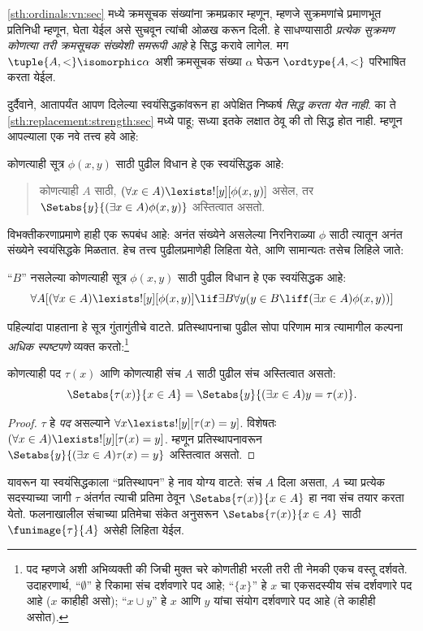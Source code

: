 \ref{sth:ordinals:vn:sec} मध्ये क्रमसूचक संख्यांना क्रमप्रकार म्हणून, म्हणजे सुक्रमणांचे प्रमाणभूत प्रतिनिधी म्हणून, घेता येईल असे सुचवून त्यांची ओळख करून दिली. हे साधण्यासाठी \emph{प्रत्येक सुक्रमण कोणत्या तरी क्रमसूचक संख्येशी समरूपी आहे} हे सिद्ध करावे लागेल. मग $\tuple{A, <} \isomorphic \alpha$ अशी क्रमसूचक संख्या $\alpha$ घेऊन $\ordtype{A, <}$ परिभाषित करता येईल.

दुर्दैवाने, आतापर्यंत आपण दिलेल्या स्वयंसिद्धकांवरून हा अपेक्षित निष्कर्ष \emph{सिद्ध करता येत नाही}. का ते \ref{sth:replacement:strength:sec} मध्ये पाहू; सध्या इतके लक्षात ठेवू की तो सिद्ध होत नाही. म्हणून आपल्याला एक नवे तत्त्व हवे आहे:

\begin{axiom}[प्रतिस्थापन-रूपबंध]
कोणत्याही सूत्र $\phi(x, y)$ साठी पुढील विधान हे एक स्वयंसिद्धक आहे:
\begin{quote}
	कोणत्याही $A$ साठी, $(\forall x \in A)\lexists![y][\phi(x,y)]$ असेल, तर $\Setabs{y}{(\exists x \in A)\phi(x,y)}$ अस्तित्वात असतो.
\end{quote}
\end{axiom}
\noindent
विभक्तीकरणाप्रमाणे हाही एक रूपबंध आहे: अनंत संख्येने असलेल्या निरनिराळ्या $\phi$ साठी त्यातून अनंत संख्येने स्वयंसिद्धके मिळतात. हेच तत्त्व पुढीलप्रमाणेही लिहिता येते, आणि सामान्यतः तसेच लिहिले जाते:

\begin{defish}
``$B$'' नसलेल्या कोणत्याही सूत्र $\phi(x,y)$ साठी पुढील विधान हे एक स्वयंसिद्धक आहे:
\[
\forall A[(\forall x \in A)\lexists![y][\phi(x,y)] \lif \exists B\forall y (y \in B \liff (\exists x \in A)\phi(x,y))]
\]
\end{defish}

पहिल्यांदा पाहताना हे सूत्र गुंतागुंतीचे वाटते. प्रतिस्थापनाचा पुढील सोपा परिणाम मात्र त्यामागील कल्पना \emph{अधिक स्पष्टपणे} व्यक्त करतो:\footnote{पद म्हणजे अशी अभिव्यक्ती की जिची मुक्त चरे कोणतीही भरली तरी ती नेमकी एकच वस्तू दर्शवते. उदाहरणार्थ, ``$\emptyset$'' हे रिकामा संच दर्शवणारे पद आहे; ``$\{x\}$'' हे $x$ चा एकसदस्यीय संच दर्शवणारे पद आहे ($x$ काहीही असो); ``$x \cup y$'' हे $x$ आणि $y$ यांचा संयोग दर्शवणारे पद आहे (ते काहीही असोत).}

\begin{cor}
कोणत्याही पद $\tau(x)$ आणि कोणत्याही संच $A$ साठी पुढील संच अस्तित्वात असतो:
\[
	\Setabs{\tau(x)}{x \in A} = \Setabs{y}{(\exists x \in A)y = \tau(x)}.
\]
\end{cor}

\begin{proof}
$\tau$ हे \emph{पद} असल्याने $\forall x \lexists![y][\tau(x) = y]$. विशेषतः $(\forall x \in A)\lexists![y][\tau(x) = y]$. म्हणून प्रतिस्थापनावरून $\Setabs{y}{(\exists x \in A)\tau(x) = y}$ अस्तित्वात असतो.
\end{proof}
\noindent
यावरून या स्वयंसिद्धकाला ``प्रतिस्थापन'' हे नाव योग्य वाटते: संच $A$ दिला असता, $A$ च्या प्रत्येक सदस्याच्या जागी $\tau$ अंतर्गत त्याची प्रतिमा ठेवून $\Setabs{\tau(x)}{x \in A}$ हा नवा संच तयार करता येतो. फलनाखालील संचाच्या प्रतिमेचा संकेत अनुसरून $\Setabs{\tau(x)}{x \in A}$ साठी $\funimage{\tau}{A}$ असेही लिहिता येईल.

